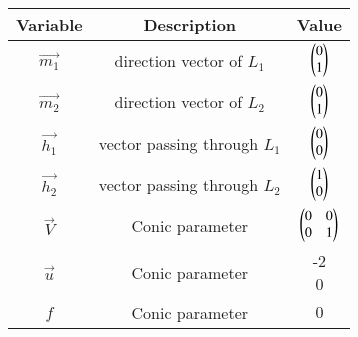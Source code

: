 \begin{tabular}[12pt]{ |c|c|c|}
    \hline
	\textbf{Variable} & \textbf{Description} & \textbf{Value}\\ 
    \hline
	$\vec{m_1}$ & direction vector of $L_1$ & $\begin{pmatrix}0\\1\end{pmatrix}$ \\
    \hline
	$\vec{m_2}$ & direction vector of $L_2$ & $\begin{pmatrix}0\\1\end{pmatrix}$\\
    \hline
	$\vec{h_1}$ &  vector passing through $L_1$ & $\begin{pmatrix}0\\0\end{pmatrix}$ \\
    \hline
	$\vec{h_2}$ &  vector passing through $L_2$ & $\begin{pmatrix}1\\0\end{pmatrix}$ \\
    \hline
	$\vec{V}$ &  Conic parameter & $\begin{pmatrix}0 & 0\\0 & 1\end{pmatrix}$\\
    \hline
	$\vec{u}$ & Conic parameter & \myvec{-2 \\0}\\
    \hline
	$f$ & Conic parameter & $0$\\
    \hline
\end{tabular}
